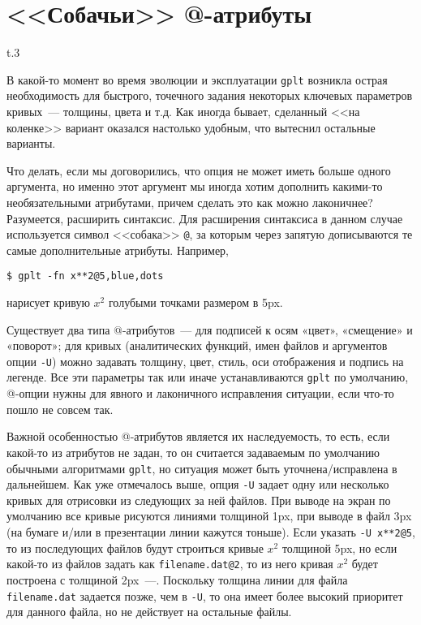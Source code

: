 \documentclass[12pt]{article}
\def\gplt{{\tt gplt}}
\begin{document}
\section{<<Собачьи>> @-атрибуты}
\begin{wrapfigure}[5]{t}{.3\textwidth}
  \vphantom{.}
  \vspace{-2.5cm}

\end{wrapfigure}
В какой-то момент во время эволюции и эксплуатации \verb'gplt' возникла острая необходимость для быстрого, точечного задания некоторых ключевых
параметров кривых~--- толщины, цвета и т.д. Как иногда бывает, сделанный <<на коленке>> вариант
оказался настолько удобным, что вытеснил остальные варианты. 

\enlargethispage{9mm}
Что делать, если мы договорились, что опция не может иметь больше одного аргумента, но именно этот аргумент мы иногда хотим дополнить какими-то необязательными атрибутами,
причем сделать это как можно лаконичнее?
Разумеется, расширить синтаксис. Для расширения синтаксиса в данном случае используется символ <<собака>> \verb'@', за которым через запятую дописываются те самые
дополнительные атрибуты. Например,
\begin{verbatim}
$ gplt -fn x**2@5,blue,dots
\end{verbatim}
нарисует кривую $x^2$ голубыми точками размером в 5px.

Существует два типа @-атрибутов~--- для подписей к осям «цвет», «смещение» и «поворот»; для кривых (аналитических функций,
имен файлов и аргументов опции \verb'-U') можно задавать толщину, цвет, стиль, оси отображения и подпись на легенде.
Все эти параметры так или иначе устанавливаются \gplt{} по умолчанию, @-опции нужны для явного и лаконичного исправления ситуации, если что-то пошло не совсем так. 

Важной особенностью @-атрибутов является их наследуемость, то есть, если какой-то из атрибутов не задан, то он считается задаваемым по умолчанию
обычными алгоритмами \gplt, но ситуация может быть уточнена/исправлена в дальнейшем.
Как уже отмечалось выше, опция \verb'-U' задает одну или несколько кривых для отрисовки из следующих за ней файлов. При выводе на экран по умолчанию
все кривые рисуются линиями толщиной 1px, при выводе в файл 3px (на бумаге и/или в презентации линии кажутся тоньше).
Если указать \verb'-U x**2@5', то из последующих файлов будут строиться кривые $x^2$ толщиной 5px, но если какой-то из файлов задать как
\verb'filename.dat@2', то из него кривая $x^2$ будет построена с толщиной 2px~---. Поскольку толщина линии для файла \verb'filename.dat' задается позже, чем в \verb'-U',
то она имеет более высокий приоритет для данного файла, но не действует на остальные файлы. 
\end{document}
